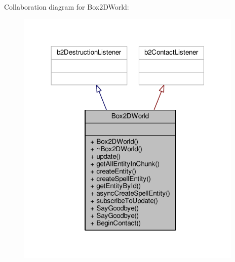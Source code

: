 Collaboration diagram for Box2\-D\-World\-:
\nopagebreak
\begin{figure}[H]
\begin{center}
\leavevmode
\includegraphics[width=306pt]{class_box2_d_world__coll__graph}
\end{center}
\end{figure}
